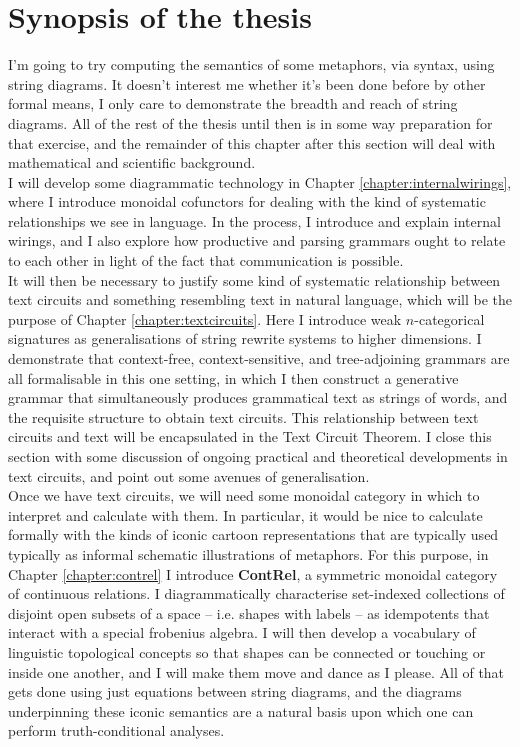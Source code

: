 \section{Synopsis of the thesis}

I'm going to try computing the semantics of some metaphors, via syntax, using string diagrams. It doesn't interest me whether it's been done before by other formal means, I only care to demonstrate the breadth and reach of string diagrams. All of the rest of the thesis until then is in some way preparation for that exercise, and the remainder of this chapter after this section will deal with mathematical and scientific background.\\

I will develop some diagrammatic technology in Chapter \ref{chapter:internalwirings}, where I introduce monoidal cofunctors for dealing with the kind of systematic relationships we see in language. In the process, I introduce and explain internal wirings, and I also explore how productive and parsing grammars ought to relate to each other in light of the fact that communication is possible.\\

It will then be necessary to justify some kind of systematic relationship between text circuits and something resembling text in natural language, which will be the purpose of Chapter \ref{chapter:textcircuits}. Here I introduce weak $n$-categorical signatures as generalisations of string rewrite systems to higher dimensions. I demonstrate that context-free, context-sensitive, and tree-adjoining grammars are all formalisable in this one setting, in which I then construct a generative grammar that simultaneously produces grammatical text as strings of words, and the requisite structure to obtain text circuits. This relationship between text circuits and text will be encapsulated in the Text Circuit Theorem. I close this section with some discussion of ongoing practical and theoretical developments in text circuits, and point out some avenues of generalisation.\\

Once we have text circuits, we will need some monoidal category in which to interpret and calculate with them. In particular, it would be nice to calculate formally with the kinds of iconic cartoon representations that are typically used typically as informal schematic illustrations of metaphors. For this purpose, in Chapter \ref{chapter:contrel} I introduce \textbf{ContRel}, a symmetric monoidal category of continuous relations. I diagrammatically characterise set-indexed collections of disjoint open subsets of a space -- i.e. shapes with labels -- as idempotents that interact with a special frobenius algebra. I will then develop a vocabulary of linguistic topological concepts so that shapes can be connected or touching or inside one another, and I will make them move and dance as I please. All of that gets done using just equations between string diagrams, and the diagrams underpinning these iconic semantics are a natural basis upon which one can perform truth-conditional analyses.\\

